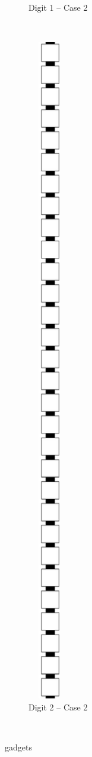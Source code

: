 \begin{itemize}
\begin{figure}[H]
\begin{subfigure}[t]{0.2\textwidth}
                \caption{\label{fig:pre_warp_case2_digit1_msr} Digit 1 -- Case 2}
            \end{subfigure}%
            ~
            \begin{subfigure}[t]{0.2\textwidth}
                \centering
                \includegraphics[width=0.2\textwidth]{warping/pre_warp_case2_digit2_msr}
                \caption{\label{fig:pre_warp_case2_digit2_msr} Digit 2 -- Case 2}
            \end{subfigure}%
            ~
            \caption{\label{fig:pre_warp_gadgets} {\prewarp} gadgets }
        \end{figure}



\end{itemize}
